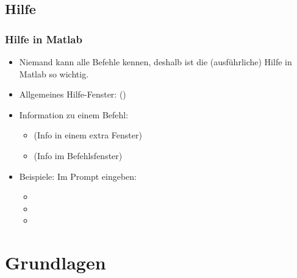     \subsection{Hilfe}
    \begin{frame}
      \frametitle{Hilfe in Matlab}
      \begin{itemize}
        \itemsep0.3cm
        \item Niemand kann alle Befehle kennen, deshalb ist die (ausführliche) Hilfe in Matlab so wichtig.
        \item Allgemeines Hilfe-Fenster:  ()
        \item Information zu einem Befehl:

        \begin{itemize}
          \itemsep0.3cm
          \item {} (Info in einem extra Fenster)
          \item {} (Info im Befehlsfenster)
        \end{itemize}


        \item Beispiele: Im Prompt eingeben:

        \begin{itemize}
          \itemsep0.3cm
          \item {}
          \item {}
          \item {}
        \end{itemize}
      \end{itemize}
    \end{frame}

    \section{Grundlagen}

